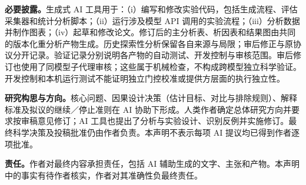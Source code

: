 \documentclass{article}
\begin{document}
\textbf{必要披露。}生成式 AI 工具用于：（i）编写和修改实验代码，包括生成流程、评估采集器和统计分析脚本；（ii）运行涉及模型 API 调用的实验流程；（iii）分析数据并制作图表；（iv）起草和修改论文。修订后的主分析表、析因表和结果图由共同的版本化重分析产物生成。历史探索性分析保留各自来源与局限；审后修正与原协议分开记录。验证记录分别说明各产物的自动测试、开发控制与审核范围。审后修订也使用了同模型子代理审核；这些属于机械检查，不构成跨模型独立科学验证。开发控制和本机运行测试不能证明独立门控校准或提供方层面的执行独立性。

\textbf{研究构思与方向。}核心问题、因果设计决策（估计目标、对比与排除规则）、解释标准及拟议的继续／停止准则在 AI 协助下形成。人类作者确定总体研究方向并要求按审稿意见修订；AI 工具也提出了分析与实验设计、识别反例并实施修订。最终科学决策及投稿批准仍由作者负责。本声明不表示每项 AI 提议均已得到作者逐项批准。

\textbf{责任。}作者对最终内容承担责任，包括 AI 辅助生成的文字、主张和产物。本声明中的事实有待作者核实，作者对其准确性负最终责任。


\appendix


\end{document}
